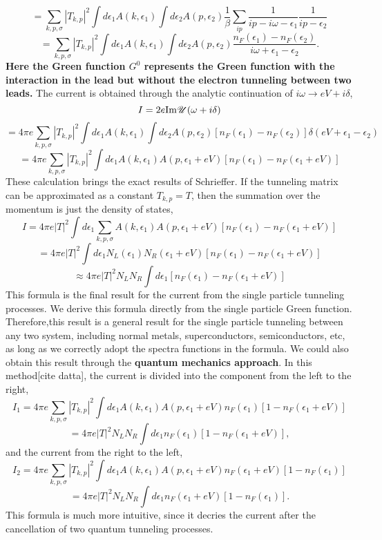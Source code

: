 \documentclass[11pt]{article}
\begin{document}
\[
= \sum_{k,p,\sigma}  |T_{k,p}|^2   \int d\epsilon_1 A(k,\epsilon_1 )    \int d\epsilon_2 A(p,\epsilon_2)      \frac{1}{\beta } \sum_{ip} \frac{1}{ip - i\omega -\epsilon_1} \frac{1}{ip-\epsilon_2}
\] \[
= \sum_{k,p,\sigma}  |T_{k,p}|^2   \int d\epsilon_1 A(k,\epsilon_1 )    \int d\epsilon_2 A(p,\epsilon_2)     \frac{n_F(\epsilon_1)- n_F(\epsilon_2)}{i\omega+\epsilon_1 - \epsilon_2}.
\] \textbf{Here the Green function \(G^0\) represents the Green function
with the interaction in the lead but without the electron tunneling
between two leads.} The current is obtained through the analytic
continuation of \(i\omega \rightarrow eV+ i\delta\), \[
I = 2e {\rm Im} \mathscr{U}(\omega +  i\delta)
\] \[
= 4\pi e \sum_{k,p,\sigma}  |T_{k,p}|^2   \int d\epsilon_1 A(k,\epsilon_1 )    \int d\epsilon_2 A(p,\epsilon_2)     \left[ n_F(\epsilon_1)- n_F(\epsilon_2)\right] \delta(eV+\epsilon_1 - \epsilon_2) 
\] \[
= 4\pi e \sum_{k,p,\sigma}  |T_{k,p}|^2   \int d\epsilon_1 A(k,\epsilon_1 )    A(p,\epsilon_1+ eV)     \left[ n_F(\epsilon_1)- n_F(\epsilon_1+ eV)\right]
\] These calculation brings the exact results of Schrieffer. If the
tunneling matrix can be approximated as a constant \(T_{k,p}=T\), then
the summation over the momentum is just the density of states, \[
I = 4\pi e  |T|^2     \int d\epsilon_1  \sum_{k,p,\sigma}  A(k,\epsilon_1 )    A(p,\epsilon_1+ eV)     \left[ n_F(\epsilon_1)- n_F(\epsilon_1+eV)\right]
\] \[
=  4\pi e  |T|^2     \int d\epsilon_1 N_L(\epsilon_1)    N_R (\epsilon_1+ eV)     \left[ n_F(\epsilon_1)- n_F(\epsilon_1+ eV)\right]
\] \[
\approx  4\pi e  |T|^2  N_L N_R   \int d\epsilon_1   \left[ n_F(\epsilon_1)- n_F(\epsilon_1+ eV)\right]
\] This formula is the final result for the current from the single
particle tunneling processes. We derive this formula directly from the
single particle Green function. Therefore,this result is a general
result for the single particle tunneling between any two system,
including normal metals, superconductors, semiconductors, etc, as long
as we correctly adopt the spectra functions in the formula. We could
also obtain this result through the \textbf{quantum mechanics approach}.
In this method{[}cite datta{]}, the current is divided into the
component from the left to the right, \[
I_1  = 4\pi e \sum_{k,p,\sigma}  |T_{k,p}|^2   \int d\epsilon_1 A(k,\epsilon_1 ) A(p,\epsilon_1+ eV ) n_F (\epsilon_1) \left[ 1- n_F(\epsilon_1 + eV) \right]
\] \[
=  4\pi e  |T|^2  N_L N_R  \int d\epsilon_1 n_F (\epsilon_1) \left[ 1- n_F(\epsilon_1 + eV) \right],
\] and the current from the right to the left, \[
I_2 =4\pi  e \sum_{k,p,\sigma}  |T_{k,p}|^2   \int d\epsilon_1 A(k,\epsilon_1 ) A(p,\epsilon_1+ eV ) n_F (\epsilon_1+eV) \left[ 1- n_F(\epsilon_1 ) \right]
\] \[
=  4\pi e  |T|^2  N_L N_R  \int d\epsilon_1 n_F (\epsilon_1+eV) \left[ 1- n_F(\epsilon_1) \right].
\] This formula is much more intuitive, since it decries the current
after the cancellation of two quantum tunneling processes.


    
    
    
    
\end{document}
